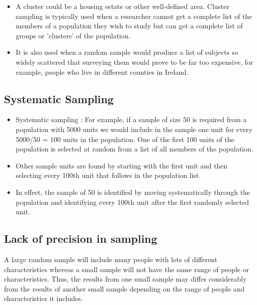﻿\documentclass[]{report}
\begin{document}

\begin{itemize}
\item A cluster could be a housing estate or other well-defined area. Cluster sampling is typically used when a researcher cannot get a complete list of the members of a population they wish to study but can get a complete list of groups or 'clusters' of the population. 
\item It is also used when a random sample would produce a list of subjects so widely scattered that surveying them would prove to be far too expensive, for example, people who live in different counties in Ireland. 
\end{itemize}

\subsection*{Systematic Sampling}
\begin{itemize}
\item Systematic sampling : For example, if a sample of size 50 is required from a population with 5000 units we would include in the sample one unit for every 5000/50 = 100 units in the population. One of the first 100 units of the population is selected at random from a list of all members of the population. 

\item Other sample units are found by starting with the first unit and then selecting every 100th unit that follows in the population list. 

\item In effect, the sample of 50 is identified by moving systematically through the population and identifying every 100th unit after the first randomly selected unit.
\end{itemize}



\subsection{Lack of precision in sampling }
A large random sample will include many people with lots of different characteristics whereas a small sample will not have the same range of people or characteristics. Thus, the results from one small sample may differ considerably from the results of another small sample depending on the range of people and characteristics it includes.
\end{document}
